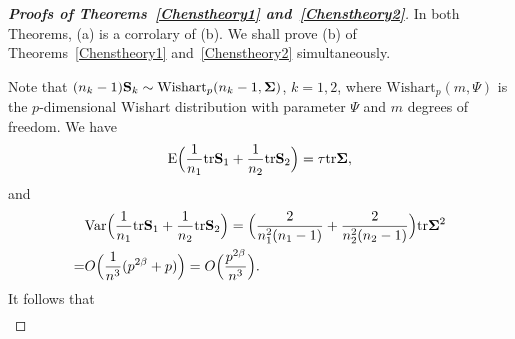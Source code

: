 \documentclass[times,sort&compress,3p]{elsarticle}
\newcommand{\mytr}{ {\rm tr} }
\newcommand{\myE}{ {\rm E} }
\newcommand{\myVar}{ {\rm Var} }
\theoremstyle{plain}
\theoremstyle{definition}
\theoremstyle{remark}
\begin{document}
\begin{appendices}
\begin{proof}[\textbf{Proofs of Theorems~\ref{Chenstheory1} and~\ref{Chenstheory2}}]
    In both Theorems, (a) is a corrolary of (b).
    We shall prove (b) of Theorems~\ref{Chenstheory1} and~\ref{Chenstheory2} simultaneously.
    
    Note that $(n_k-1)\BS_k\sim \text{Wishart}_p(n_k-1,\bSigma)$, $k=1,2$,
    where $\text{Wishart}_p(m,\Psi)$ is the $p$-dimensional Wishart distribution with parameter $\Psi$ and $m$ degrees of freedom.
    We have %
%
    $$
 \myE\Big(\frac{1}{n_1}\mytr \BS_1+\frac{1}{n_2}\mytr \BS_2\Big)=\tau \mytr\bSigma,
    $$
    and
    $$
    \begin{aligned}
        &\myVar\Big(\frac{1}{n_1}\mytr \BS_1+\frac{1}{n_2}\mytr \BS_2\Big)=
        \Big(\frac{2}{n_1^2(n_1-1)}+\frac{2}{n_2^2(n_2-1)}\Big)\mytr \bSigma^2\\
        =&
    O\Big(\frac{1}{n^3}(p^{2\beta}+p)\Big)=O\Big(\frac{p^{2\beta}}{n^3}\Big).
    \end{aligned}
    $$
    It follows that
    $$
    \begin{aligned}

\end{aligned}$$
\end{proof}
\end{appendices}
\end{document}
